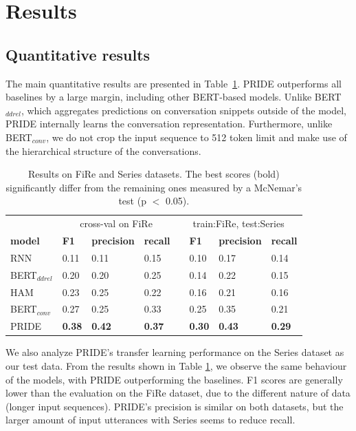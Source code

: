 \section{Results}

\subsection{Quantitative results}
The main quantitative results are presented in \mbox{Table \ref{tab:main_exp}}. PRIDE outperforms all baselines by a large margin, including other BERT-based models.
Unlike BERT$_{ddrel}$, which aggregates predictions on conversation snippets outside of the model, PRIDE internally learns the conversation representation.
Furthermore, unlike BERT$_{conv}$, we do not crop the input sequence to 512 token limit and make use of the hierarchical structure of the conversations.

\begin{table}[]
\centering
\begin{adjustbox}{width=0.7\textwidth}
\begin{tabular}{@{}llllllll@{}}
 & \multicolumn{3}{c}{cross-val on FiRe} & \multicolumn{4}{c}{train:FiRe, test:Series} \\
 \cmidrule(lr){2-4} \cmidrule(lr){5-8}
\textbf{model}           & \textbf{F1}   & \textbf{precision} & \textbf{recall} & &  \textbf{F1}   & \textbf{precision} & \textbf{recall} \\ \toprule
RNN             & 0.11 & 0.11      & 0.15  & & 0.10 & 0.17 & 0.14 \\
BERT$_{ddrel}$ & 0.20 & 0.20      & 0.25   & & 0.14 & 0.22 & 0.15 \\
HAM             & 0.23 & 0.25      & 0.22  & & 0.16 & 0.21 & 0.16 \\
BERT$_{conv}$  & 0.27 & 0.25      & 0.33   & & 0.25 & 0.35 & 0.21 \\ \midrule
PRIDE           & \textbf{0.38} & \textbf{0.42}      & \textbf{0.37} & & \textbf{0.30} & \textbf{0.43}      & \textbf{0.29}\\
\end{tabular}
\end{adjustbox}
\caption{Results on FiRe and Series datasets. The best scores (bold) significantly differ from the remaining ones measured by a McNemar’s test (p $<$ 0.05).}
\label{tab:main_exp}
\end{table}

We also analyze PRIDE's transfer learning performance on the Series dataset as our test data. 
From the results shown in Table \ref{tab:main_exp}, we observe the same behaviour of the models, with PRIDE outperforming the baselines. 
F1 scores are generally lower than the evaluation on the FiRe dataset, 
due to the different nature of data (longer input sequences). 
PRIDE's precision is similar on both datasets, but the larger amount of input utterances with Series seems to reduce recall.

